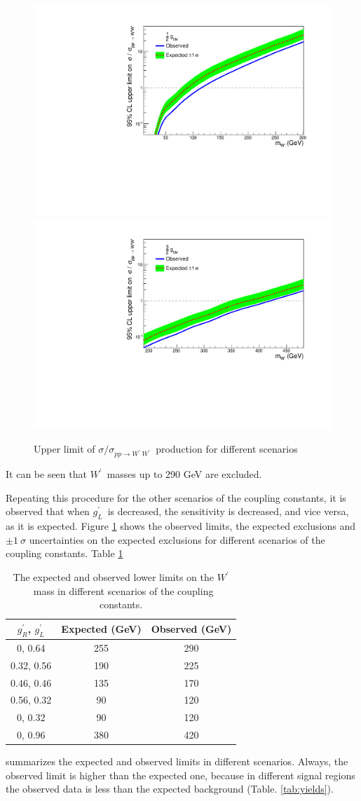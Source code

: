 \documentclass[preprint,showpacs,preprintnumbers]{revtex4}
\newcommand{\wprime}{\ensuremath{W^\prime}~}
\newcommand{\gR}{\ensuremath{g^\prime_R}}
\newcommand{\gL}{\ensuremath{g^\prime_L}}
\begin{document}
\begin{figure}[!htb]
	\includegraphics*[width=.45\textwidth]{mixHalvedb.pdf}
	\vspace{3mm}
	\includegraphics*[width=.45\textwidth]{mix3Over2b.pdf}
	\caption{Upper limit of $\sigma/\sigma_{pp \rightarrow \wprime \wprime}$ production for different scenarios}
	\label{fig:brazilianFlags}
\end{figure}
It can be seen that \wprime masses up to  290 GeV are excluded.  

Repeating this procedure for the other scenarios of the coupling constants, it is observed that when \gL ~is decreased, the sensitivity is decreased, and vice versa, as it is expected. Figure \ref{fig:brazilianFlags} shows the observed limits, the expected exclusions and $\pm 1 ~\sigma$ uncertainties on the expected exclusions for different scenarios of the coupling constants. Table \ref{tab:ObservedLimits}
\begin{table}[htb]
	\centering
	\caption{The expected and observed lower limits on the \wprime mass in different scenarios of the coupling constants. \label{tab:ObservedLimits} }
	\begin{tabular}{|c|c|c|}
		\hline
		\gR, \gL           & Expected (GeV) & Observed (GeV) \\\hline
		0, 0.64            &   255    &    290  \\
		0.32, 0.56         &   190    &    225  \\
		0.46, 0.46         &   135    &    170  \\
		0.56, 0.32         &   90     &    120  \\
		0, 0.32            &   90     &    120  \\
		0, 0.96            &   380    &    420  \\\hline
	\end{tabular}
\end{table}
summarizes the expected and observed limits in different scenarios. Always, the observed limit is higher than the expected one, because in different signal regions the observed data is less than the expected background (Table. \ref{tab:yields}).
\end{document}
